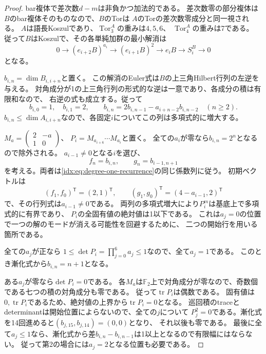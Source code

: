 \documentclass[11pt,a4paper]{ltjsarticle}
\theoremstyle{definition}
\begin{document}
\begin{proof}
bar複体で差次数$d-m$は非負かつ加法的である。
差次数零の部分複体は$B$のbar複体そのものなので、$B$のTorは
$A$のTorの差次数零成分と同一視される。
$A$は語長Koszulであり、$\operatorname{Tor}_3^A$の重みは$4,5,6$、
$\operatorname{Tor}_4^A$の重みは7である。
従って$B$はKoszulで、その各単純加群の最小解消は
\[
0\longrightarrow(e_{i+2}B)^{a_i}
\longrightarrow(e_{i+1}B)^2
\longrightarrow e_iB\longrightarrow S_i^B\longrightarrow0
\]
となる。

$b_{i,n}=\dim B_{i,i+n}$と置く。
この解消のEuler式は$B$の上三角Hilbert行列の左逆を与える。
対角成分が1の上三角行列の形式的な逆は一意であり、各成分の積は有限和なので、
右逆の式も成立する。従って
\begin{equation}\label{idx:eq:degree-one-recurrence}
b_{i,0}=1,\quad b_{i,1}=2,\qquad
b_{i,n}=2b_{i,n-1}-a_{i+n-2}b_{i,n-2}\quad(n\geq2).
\end{equation}
$b_{i,n}\leq\dim A_{i,i+n}$なので、各固定$i$についてこの列は多項式的に増大する。

$M_a=\left(\begin{smallmatrix}2&-a\\1&0\end{smallmatrix}\right)$、
$P_i=M_{a_{i+6}}\cdots M_{a_i}$と置く。
全ての$a_i$が零なら$b_{i,n}=2^n$となるので除外される。
$a_{i-1}\ne0$となる$i$を選び、
\[
f_n=b_{i,n},\qquad g_n=b_{i-1,n+1}
\]
を考える。両者は\eqref{idx:eq:degree-one-recurrence}の同じ係数列に従う。
初期ベクトルは
\[
(f_1,f_0)^{\mathsf T}=(2,1)^{\mathsf T},\qquad
(g_1,g_0)^{\mathsf T}=(4-a_{i-1},2)^{\mathsf T}
\]
で、その行列式は$a_{i-1}\ne0$である。
両列の多項式増大により$P_i^m$は基底上で多項式的に有界であり、
$P_i$の全固有値の絶対値は1以下である。
これは$a_j=0$の位置で一つの解のモードが消える可能性を回避するために、
二つの開始行を用いる箇所である。

全ての$a_j$が正なら
$1\leq\det P_i=\prod_{j=0}^{6}a_j\leq1$なので、全て$a_j=1$である。
このとき漸化式から$b_{i,n}=n+1$となる。

ある$a_j$が零なら$\det P_i=0$である。
各$M_a$は$\mathbb F_2$上で対角成分が零なので、奇数個である七つの積の対角成分も零である。
従って$\operatorname{tr}P_i$は偶数である。
固有値は$0,\operatorname{tr}P_i$であるため、絶対値の上界から$\operatorname{tr}P_i=0$となる。
巡回積のtraceとdeterminantは開始位置によらないので、全ての$j$について
$P_j^2=0$である。漸化式を14回進めると$(b_{j,15},b_{j,14})=(0,0)$となり、
それ以後も零である。
最後に全て$a_j\leq1$なら、漸化式から差$b_{i,n}-b_{i,n-1}$は1以上となるので有限幅にはならない。
従って第2の場合には$a_j=2$となる位置も必要である。
\end{proof}
\end{document}
